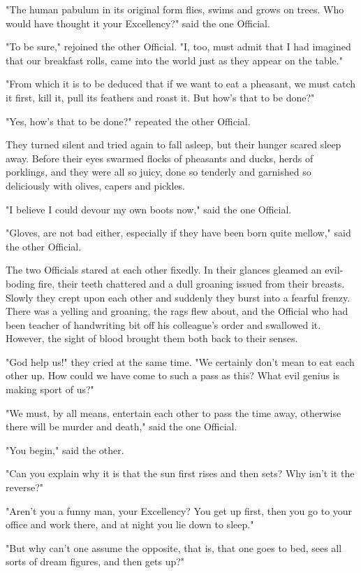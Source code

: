 "The human pabulum in its original form flies, swims and grows on
trees. Who would have thought it your Excellency?" said the one
Official.

"To be sure," rejoined the other Official. "I, too, must admit that I
had imagined that our breakfast rolls, came into the world just as
they appear on the table."

"From which it is to be deduced that if we want to eat a pheasant, we
must catch it first, kill it, pull its feathers and roast it. But
how's that to be done?"

"Yes, how's that to be done?" repeated the other Official.

They turned silent and tried again to fall asleep, but their hunger
scared sleep away. Before their eyes swarmed flocks of pheasants and
ducks, herds of porklings, and they were all so juicy, done so
tenderly and garnished so deliciously with olives, capers and pickles.

"I believe I could devour my own boots now," said the one Official.

"Gloves, are not bad either, especially if they have been born quite
mellow," said the other Official.

The two Officials stared at each other fixedly. In their glances
gleamed an evil-boding fire, their teeth chattered and a dull groaning
issued from their breasts. Slowly they crept upon each other and
suddenly they burst into a fearful frenzy. There was a yelling and
groaning, the rags flew about, and the Official who had been teacher
of handwriting bit off his colleague's order and swallowed it.
However, the sight of blood brought them both back to their senses.

"God help us!" they cried at the same time. "We certainly don't mean
to eat each other up. How could we have come to such a pass as this?
What evil genius is making sport of us?"

"We must, by all means, entertain each other to pass the time away,
otherwise there will be murder and death," said the one Official.

"You begin," said the other.

"Can you explain why it is that the sun first rises and then sets? Why
isn't it the reverse?"

"Aren't you a funny man, your Excellency? You get up first, then you
go to your office and work there, and at night you lie down to sleep."

"But why can't one assume the opposite, that is, that one goes to
bed, sees all sorts of dream figures, and then gets up?"

